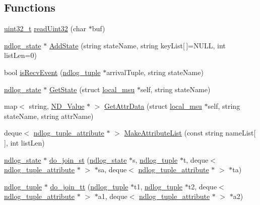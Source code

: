 \subsection*{Functions}
\begin{DoxyCompactItemize}
\item 
\hyperlink{msus_2webserver_2uthash_8h_a435d1572bf3f880d55459d9805097f62}{uint32\-\_\-t} \hyperlink{helper-function_8h_aadd03fb3a74f1cdecd87bbd2a18a6788}{read\-Uint32} (char $\ast$buf)
\item 
\hyperlink{structndlog__state}{ndlog\-\_\-state} $\ast$ \hyperlink{helper-function_8h_adfbca9db4333540df8a0e1ef94689bd9}{Add\-State} (string state\-Name, string key\-List\mbox{[}$\,$\mbox{]}=N\-U\-L\-L, int list\-Len=0)
\item 
bool \hyperlink{helper-function_8h_a1ef30aab6706faf1972bbc3ce2df03d3}{is\-Recv\-Event} (\hyperlink{structndlog__tuple}{ndlog\-\_\-tuple} $\ast$arrival\-Tuple, string state\-Name)
\item 
\hyperlink{structndlog__state}{ndlog\-\_\-state} $\ast$ \hyperlink{helper-function_8h_a0ab06924c91416c26f84e4bf50c0a367}{Get\-State} (struct \hyperlink{structlocal__msu}{local\-\_\-msu} $\ast$self, string state\-Name)
\item 
map$<$ string, \hyperlink{class_n_d___value}{N\-D\-\_\-\-Value} $\ast$ $>$ \hyperlink{helper-function_8h_a2e7b86789b841df071507f7d301b16ea}{Get\-Attr\-Data} (struct \hyperlink{structlocal__msu}{local\-\_\-msu} $\ast$self, string state\-Name, string attr\-Name)
\item 
deque$<$ \hyperlink{structndlog__tuple__attribute}{ndlog\-\_\-tuple\-\_\-attribute} $\ast$ $>$ \hyperlink{helper-function_8h_a949644440d7002f63f57c4d249e936f6}{Make\-Attribute\-List} (const string name\-List\mbox{[}$\,$\mbox{]}, int list\-Len)
\item 
\hyperlink{structndlog__state}{ndlog\-\_\-state} $\ast$ \hyperlink{helper-function_8h_a5e335a6a9e3ded6bc49fcb946241a3f6}{do\-\_\-join\-\_\-st} (\hyperlink{structndlog__state}{ndlog\-\_\-state} $\ast$s, \hyperlink{structndlog__tuple}{ndlog\-\_\-tuple} $\ast$t, deque$<$ \hyperlink{structndlog__tuple__attribute}{ndlog\-\_\-tuple\-\_\-attribute} $\ast$ $>$ $\ast$sa, deque$<$ \hyperlink{structndlog__tuple__attribute}{ndlog\-\_\-tuple\-\_\-attribute} $\ast$ $>$ $\ast$ta)
\item 
\hyperlink{structndlog__tuple}{ndlog\-\_\-tuple} $\ast$ \hyperlink{helper-function_8h_a3af4d8ab83a55e09c7258f92b6ba3f6b}{do\-\_\-join\-\_\-tt} (\hyperlink{structndlog__tuple}{ndlog\-\_\-tuple} $\ast$t1, \hyperlink{structndlog__tuple}{ndlog\-\_\-tuple} $\ast$t2, deque$<$ \hyperlink{structndlog__tuple__attribute}{ndlog\-\_\-tuple\-\_\-attribute} $\ast$ $>$ $\ast$a1, deque$<$ \hyperlink{structndlog__tuple__attribute}{ndlog\-\_\-tuple\-\_\-attribute} $\ast$ $>$ $\ast$a2)

\end{DoxyCompactItemize}
